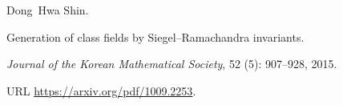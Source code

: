 Dong~Hwa Shin.

\newblock Generation of class fields by {Siegel--Ramachandra} invariants.

\newblock \emph{Journal of the Korean Mathematical Society}, 52
  (5): 907--928, 2015.

\newblock URL \url{https://arxiv.org/pdf/1009.2253}.
